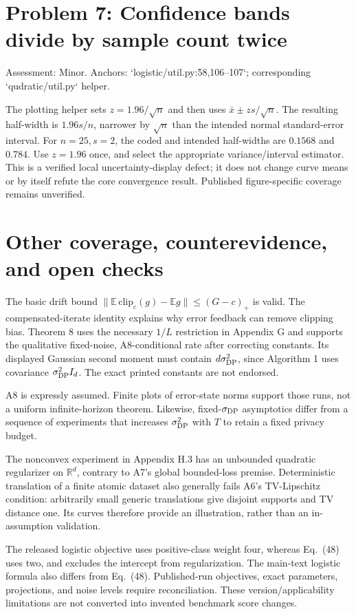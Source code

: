 \documentclass[10pt]{article}
\begin{document}
\section*{Problem 7: Confidence bands divide by sample count twice}
Assessment: Minor. Anchors: `logistic/util.py:58,106--107`; corresponding `qudratic/util.py` helper.\par
The plotting helper sets \(z=1.96/\sqrt n\) and then uses \(\bar x\pm z s/\sqrt n\). The resulting half-width is \(1.96s/n\), narrower by \(\sqrt n\) than the intended normal standard-error interval. For \(n=25,s=2\), the coded and intended half-widths are \(0.1568\) and \(0.784\). Use \(z=1.96\) once, and select the appropriate variance/interval estimator. This is a verified local uncertainty-display defect; it does not change curve means or by itself refute the core convergence result. Published figure-specific coverage remains unverified.\par
\section*{Other coverage, counterevidence, and open checks}
The basic drift bound \(\|\mathbb E\,\mathrm{clip}_c(g)-\mathbb E g\|\le(G-c)_+\) is valid. The compensated-iterate identity explains why error feedback can remove clipping bias. Theorem 8 uses the necessary \(1/L\) restriction in Appendix G and supports the qualitative fixed-noise, A8-conditional rate after correcting constants. Its displayed Gaussian second moment must contain \(d\sigma_{\rm DP}^2\), since Algorithm 1 uses covariance \(\sigma_{\rm DP}^2I_d\). The exact printed constants are not endorsed.\par
A8 is expressly assumed. Finite plots of error-state norms support those runs, not a uniform infinite-horizon theorem. Likewise, fixed-\(\sigma_{\rm DP}\) asymptotics differ from a sequence of experiments that increases \(\sigma_{\rm DP}^2\) with \(T\) to retain a fixed privacy budget.\par
The nonconvex experiment in Appendix H.3 has an unbounded quadratic regularizer on \(\mathbb R^d\), contrary to A7’s global bounded-loss premise. Deterministic translation of a finite atomic dataset also generally fails A6’s TV-Lipschitz condition: arbitrarily small generic translations give disjoint supports and TV distance one. Its curves therefore provide an illustration, rather than an in-assumption validation.\par
The released logistic objective uses positive-class weight four, whereas Eq. (48) uses two, and excludes the intercept from regularization. The main-text logistic formula also differs from Eq. (48). Published-run objectives, exact parameters, projections, and noise levels require reconciliation. These version/applicability limitations are not converted into invented benchmark score changes.\par
\end{document}
